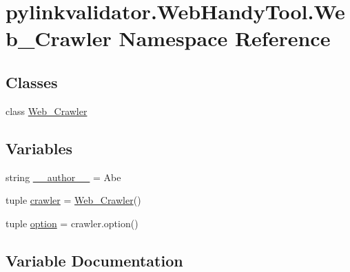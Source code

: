 \hypertarget{namespacepylinkvalidator_1_1_web_handy_tool_1_1_web___crawler}{}\section{pylinkvalidator.\+Web\+Handy\+Tool.\+Web\+\_\+\+Crawler Namespace Reference}
\label{namespacepylinkvalidator_1_1_web_handy_tool_1_1_web___crawler}
\subsection*{Classes}
\begin{DoxyCompactItemize}
\item 
class \hyperlink{classpylinkvalidator_1_1_web_handy_tool_1_1_web___crawler_1_1_web___crawler}{Web\+\_\+\+Crawler}
\end{DoxyCompactItemize}
\subsection*{Variables}
\begin{DoxyCompactItemize}
\item 
string \hyperlink{namespacepylinkvalidator_1_1_web_handy_tool_1_1_web___crawler_affb3151f3f1a14a483da5ff3c2c148cf}{\+\_\+\+\_\+author\+\_\+\+\_\+} = \textquotesingle{}Abe\textquotesingle{}
\item 
tuple \hyperlink{namespacepylinkvalidator_1_1_web_handy_tool_1_1_web___crawler_a3b4c79fe9756714e1b12573b644499bc}{crawler} = \hyperlink{classpylinkvalidator_1_1_web_handy_tool_1_1_web___crawler_1_1_web___crawler}{Web\+\_\+\+Crawler}()
\item 
tuple \hyperlink{namespacepylinkvalidator_1_1_web_handy_tool_1_1_web___crawler_a51cc3473f0ab9b1254af83e5559b129e}{option} = crawler.\+option()
\end{DoxyCompactItemize}


\subsection{Variable Documentation}
